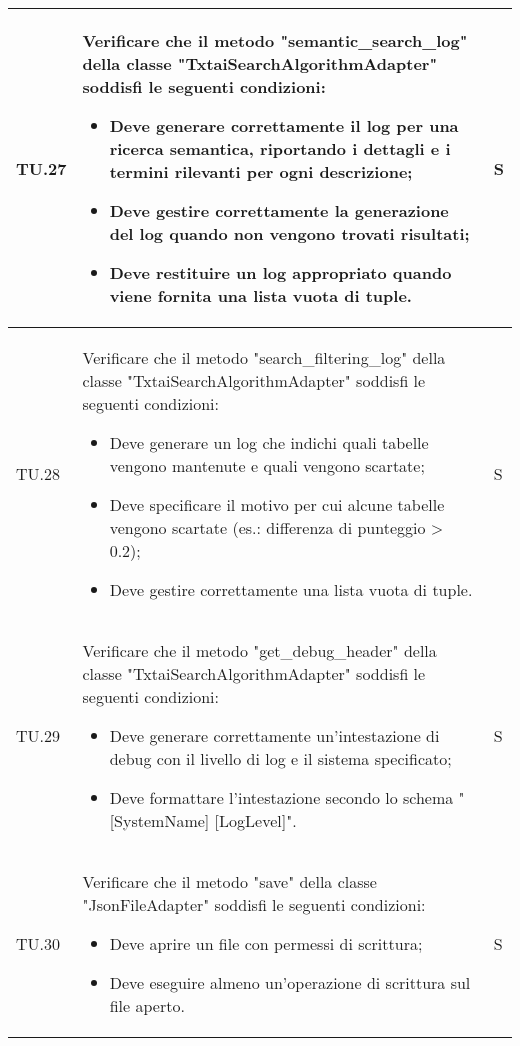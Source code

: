 \begin{adjustwidth}{-0.5cm}{-0.5cm}
\begin{longtable}{|P{1.5cm}|>{\raggedright}P{9.5cm}|>{\arraybackslash}P{1.5cm}|}
		\hline TU.27 & Verificare che il metodo "semantic\_search\_log" della classe "TxtaiSearchAlgorithmAdapter" soddisfi le seguenti condizioni:
		\begin{itemize}
			\item Deve generare correttamente il log per una ricerca semantica, riportando i dettagli e i termini rilevanti per ogni descrizione;
			\item Deve gestire correttamente la generazione del log quando non vengono trovati risultati;
			\item Deve restituire un log appropriato quando viene fornita una lista vuota di tuple.
		\end{itemize} & S \\

		\hline TU.28 & Verificare che il metodo "search\_filtering\_log" della classe "TxtaiSearchAlgorithmAdapter" soddisfi le seguenti condizioni:
		\begin{itemize}
			\item Deve generare un log che indichi quali tabelle vengono mantenute e quali vengono scartate;
			\item Deve specificare il motivo per cui alcune tabelle vengono scartate (es.: differenza di punteggio > 0.2);
   			\item Deve gestire correttamente una lista vuota di tuple.
		\end{itemize} & S \\

		\hline TU.29 & Verificare che il metodo "get\_debug\_header" della classe "TxtaiSearchAlgorithmAdapter" soddisfi le seguenti condizioni:
		\begin{itemize}
			\item Deve generare correttamente un'intestazione di debug con il livello di log e il sistema specificato;
			\item Deve formattare l'intestazione secondo lo schema "[SystemName] [LogLevel]".
		\end{itemize} & S \\

		\hline TU.30 & Verificare che il metodo "save" della classe "JsonFileAdapter" soddisfi le seguenti condizioni:
		\begin{itemize}
			\item Deve aprire un file con permessi di scrittura;
			\item Deve eseguire almeno un'operazione di scrittura sul file aperto.
		\end{itemize} & S \\


\end{longtable}
\end{adjustwidth}
